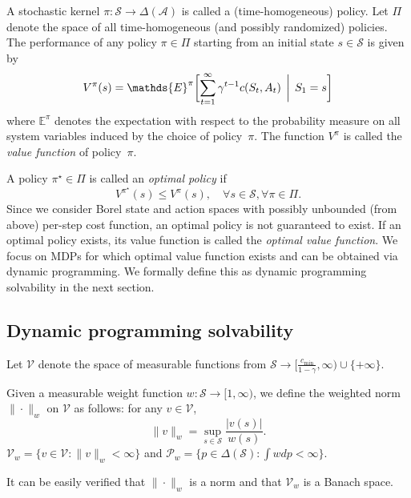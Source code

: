 \documentclass[letterpaper, 10pt]{IEEEtran}
\newcommand*\ALPHABET{\mathcal}
\newcommand*\EXP{\mathds{E}}
\begin{document}
A  stochastic kernel $\pi \colon \ALPHABET S \to \Delta(\ALPHABET A)$ is called a
(time-homogeneous) policy. Let $\Pi$ denote the space of all time-homogeneous
(and possibly randomized) policies. The performance of any policy $\pi \in
\Pi$ starting from an initial state $s \in \ALPHABET S$ is given by 
\begin{equation}\label{eq:value}
  V^\pi(s) = \EXP^\pi \biggl[
    \sum_{t=1}^\infty \gamma^{t-1} c(S_t, A_t) \,\biggm|\, S_1 = s 
  \biggr]
\end{equation}
where $\EXP^{\pi}$ denotes the expectation with respect to the probability measure on all
system variables induced by the choice of policy~$\pi$. The function $V^\pi$
is called the \emph{value function} of policy~$\pi$. 

A policy $\pi^\star \in \Pi$ is called an \emph{optimal policy} if 
\begin{equation}\label{eq:opt}
  V^{\pi^\star}(s) \le V^\pi(s), 
  \quad \forall s \in \ALPHABET S, \forall \pi \in \Pi.
\end{equation}
Since we consider Borel state and action spaces with possibly unbounded (from above)
per-step cost function, an optimal policy is not guaranteed to exist.  If an optimal policy exists, its value function is called the \emph{optimal value function}. 
We focus on MDPs for which optimal value function exists and can be obtained via dynamic programming. We formally define this as dynamic programming solvability in the next section.

\subsection{Dynamic programming solvability}
Let $\ALPHABET V$ denote the space of measurable functions from $\ALPHABET
S \to [\frac{c_{\min}}{1-\gamma},\infty) \cup \{ + \infty \}$. 

\begin{definition}
    Given a measurable weight function $w \colon \ALPHABET S \to [1, \infty)$, we define the weighted norm $\| \cdot \|_{w}$ on $\ALPHABET V$ as follows: for any $v \in \ALPHABET V$,
    \goodbreak
    \[
       \| v \|_w = \sup_{s \in \ALPHABET S}
       \frac{ |v(s)| }{ w(s) }.
    \]
        $\ALPHABET V_w = \bigl\{ v \in \ALPHABET V : \|v\|_w < \infty \bigr\}$
        and
        $\ALPHABET P_w = \bigl\{ p \in \Delta(\ALPHABET S) : \int w dp < \infty \bigr\}$. 
\end{definition}
It can be easily verified that $\| \cdot \|_w$ is a norm and that $\ALPHABET V_w$ is  a Banach space.
\end{document}
